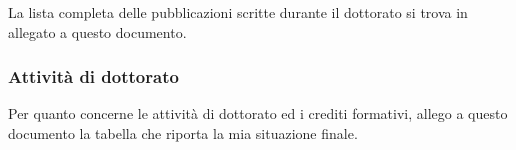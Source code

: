 \documentclass{article}
\begin{document}
La lista completa delle pubblicazioni scritte durante il dottorato si trova in allegato a questo documento.

\subsubsection*{Attività di dottorato}

Per quanto concerne le attività di dottorato ed i crediti formativi, allego a questo documento la tabella che riporta la mia situazione finale.

\vspace{20px}



\end{document}
